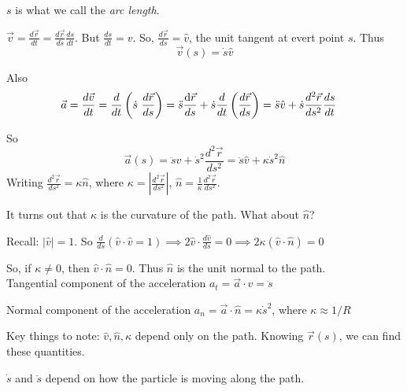 \begin{definition} $s$ is what we call the \emph{arc length}. 

$\displaystyle{\vec{v} = \frac{d\vec{r}}{dt} = \frac{d\vec{r}}{ds}\frac{ds}{dt}}$. But $\displaystyle{\frac{ds}{dt} = v}$. So, $\displaystyle{\frac{d\vec{r}}{ds} = \hat{v}}$, the unit tangent at evert point $s$. Thus
\[\vec{v}(s) = \dot{s}\hat{v}\]

Also \[\begin{aligned}
	\vec{a} = \frac{d\vec{v}}{dt} = \frac{d}{dt}\left(\dot{s}~ \frac{d\vec{r}}{ds}\right) = \ddot{s}\frac{\d\vec{r}}{ds} + \dot{s}\frac{d}{dt}\left(\frac{d\vec{r}}{ds}\right) &= \ddot{s}\hat{v} + \dot{s}\frac{d^2\vec{r}}{ds^2}\frac{ds}{dt}
\end{aligned}
\]

So
\[\vec{a}(s) = \ddot{s}\hat{v} + \dot{s}^2\frac{d^2\vec{r}}{ds^2} = \ddot{s}\hat{v} + \kappa \dot{s}^2\hat{n}\]
Writing $\displaystyle{\frac{d^2\vec{r}}{ds^2} = \kappa \hat{n}}$, where $\displaystyle{\kappa =\left|\frac{d^2\vec{r}}{ds^2}\right| }$, $\hat{n} = \displaystyle{\frac{1}{\kappa}\frac{d^2\vec{r}}{ds^2}}$.
\end{definition}

It turns out that $\kappa$ is the curvature of the path. What about $\hat{n}$?

Recall: $|\hat{v}| = 1$. So $\frac{d}{ds}(\hat{v}\cdot\hat{v} = 1) \implies 2\hat{v}\cdot\frac{d\hat{v}}{ds} = 0 \implies 2\kappa(\hat{v}\cdot\hat{n}) = 0$

So, if $\kappa \neq 0$, then $\hat{v}\cdot \hat{n} = 0$. Thus $\hat{n}$ is the unit normal to the path.\\

Tangential component of the acceleration $a_t = \vec{a}\cdot\hat{v} = \ddot{s}$

Normal component of the acceleration $a_n = \vec{a}\cdot\hat{n} = \kappa \dot{s}^2$, where $\kappa \approx 1/R$
\vspace*{100pt}

Key things to note: $\hat{v}, \hat{n}, \kappa$ depend only on the path. Knowing $\vec{r}(s)$, we can find these 	quantities. 

$\dot{s}$ and $\ddot{s}$ depend on how the particle is moving along the path.\\


